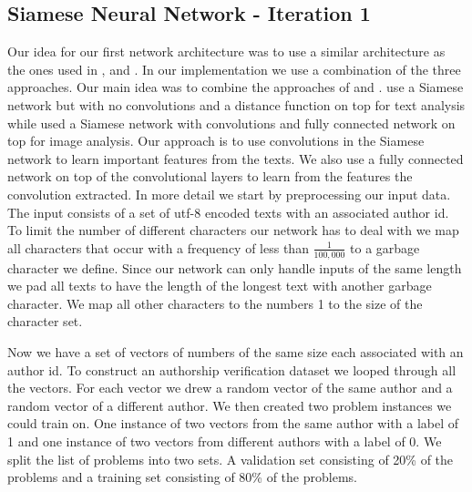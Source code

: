 \subsection{Siamese Neural Network - Iteration 1}


Our idea for our first network architecture was to use a similar architecture
as the ones used in \cite{Koch2015SiameseNN}, \cite{NIPS1993_769} and
\cite{qian:2018}. In our implementation we use a combination of the three
approaches. Our main idea was to combine the approaches of \cite{qian:2018}
and \cite{Koch2015SiameseNN}. \cite{qian:2018} use a Siamese network but
with no convolutions and a distance function on top for text analysis while
\cite{Koch2015SiameseNN} used a Siamese network with convolutions and fully
connected network on top for image analysis. Our approach is to use convolutions
in the Siamese network to learn important features from the texts. We also use
a fully connected network on top of the convolutional layers to learn from the
features the convolution extracted. In more detail we start by preprocessing
our input data. The input consists of a set of utf-8 encoded texts with an
associated author id. To limit the number of different characters our network
has to deal with we map all characters that occur with a frequency of less than
$\frac{1}{100,000}$ to a garbage character we define. Since our network can only
handle inputs of the same length we pad all texts to have the length of the
longest text with another garbage character. We map all other characters to the
numbers 1 to the size of the character set.

Now we have a set of vectors of numbers of the same size each associated with
an author id. To construct an authorship verification dataset we looped through
all the vectors. For each vector we drew a random vector of the same author and
a random vector of a different author. We then created two problem instances we
could train on. One instance of two vectors from the same author with a label of
1 and one instance of two vectors from different authors with a label of 0. We
split the list of problems into two sets. A validation set consisting of 20\% of
the problems and a training set consisting of 80\% of the problems.

